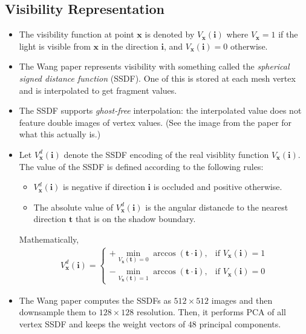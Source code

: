 \documentclass[10pt]{article}
\newcommand{\ve}[1]{\mathbf{#1}}
\begin{document}
  \subsection{Visibility Representation} \label{sg-visibility}
  \begin{itemize}
    \item The visibility function at point $\ve{x}$ is denoted by $V_{\ve{x}}(\ve{i})$ where $V_{\ve{x}} = 1$ if the light is visible from $\ve{x}$ in the direction $\ve{i}$, and $V_{\ve{x}}(\ve{i}) = 0$ otherwise.

    \item The Wang paper represents visibility with something called the \emph{spherical signed distance function} (SSDF).  One of this is stored at each mesh vertex and is interpolated to get fragment values.  

    \item The SSDF supports \emph{ghost-free} interpolation: the interpolated value does not feature double images of vertex values.  (See the image from the paper for what this actually is.)    

    \item Let $V^d_{\ve{x}}(\ve{i})$ denote the SSDF encoding of the real visiblity function $V_{\ve{x}}(\ve{i})$.  The value of the SSDF is defined according to the following rules:
    \begin{itemize}
      \item $V^d_{\ve{x}}(\ve{i})$ is negative if direction $\ve{i}$ is occluded and positive otherwise.
      \item The absolute value of $V^d_{\ve{x}}(\ve{i})$ is the angular distancde to the nearest direction $\ve{t}$ that is on the shadow boundary.
    \end{itemize}
    Mathematically,
    \begin{align*}
      V^d_{\ve{x}}(\ve{i}) = \begin{cases}
        + \underset{V_{\ve{x}}(\ve{t}) = 0}{\min} \arccos(\ve{t} \cdot \ve{i}), & \mbox{if }V_{\ve{x}}(\ve{i}) = 1 \\
        - \underset{V_{\ve{x}}(\ve{t}) = 1}{\min} \arccos(\ve{t} \cdot \ve{i}), & \mbox{if }V_{\ve{x}}(\ve{i}) = 0
      \end{cases}
    \end{align*}

    \item The Wang paper computes the SSDFs as $512 \times 512$ images and then downsample them to $128 \times 128$ resolution.  Then, it performs PCA of all vertex SSDF and keeps the weight vectors of $48$ principal components.


\end{itemize}
\end{document}
